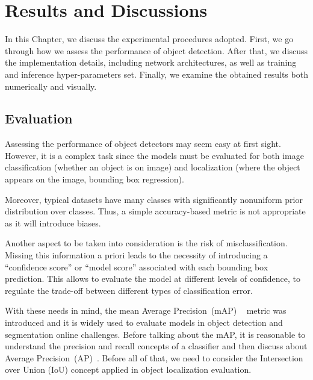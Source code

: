 \chapter{Results and Discussions}
\label{chap:results}
%
In this Chapter, we discuss the experimental procedures adopted.
First, we go through how we assess the performance of object detection.
After that, we discuss the implementation details, including network architectures, as well as training and inference hyper-parameters set.
Finally, we examine the obtained results both numerically and visually.


\section{Evaluation}
\label{sec:eval}

Assessing the performance of object detectors may seem easy at first sight.
However, it is a complex task since the models must be evaluated for both image classification (whether an object is on image)  and localization (where the object appears on the image, \ie bounding box regression).

Moreover, typical datasets have many classes with significantly nonuniform prior distribution over classes.
Thus, a simple accuracy-based metric is not appropriate as it will introduce biases.

Another aspect to be taken into consideration is the risk of misclassification.
Missing this information a priori leads to the necessity of introducing a ``confidence score'' or ``model score'' associated with each bounding box prediction.
This allows to evaluate the model at different levels of confidence, \ie
to regulate the trade-off between different types of classification error.

With these needs in mind, the mean Average Precision~(mAP)
~\cite{Everingham10}
metric was introduced and it is widely used to evaluate models in object detection and segmentation online challenges.
Before talking about the mAP, it is reasonable to understand the precision and recall concepts of a classifier and then
discuss about  Average Precision~(AP)~\cite{Everingham10}.
%
%
Before all of that, we need to consider the Intersection over Union (IoU)  concept applied in object localization evaluation.


